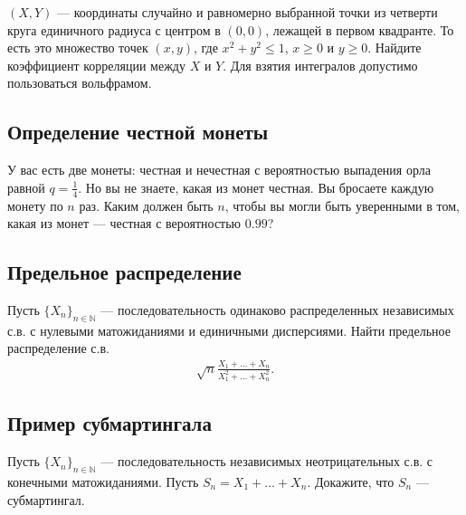 \documentclass[12pt]{article}
\newcommand\N{\mathbb{N}}
\begin{document}
$(X, Y)$ --- координаты случайно и равномерно выбранной точки из четверти круга единичного радиуса с центром в $(0, 0)$, лежащей в первом квадранте. То есть это множество точек $(x, y)$, где $x^2 + y^2 \le 1$, $x \ge 0$ и $y \ge 0$. Найдите коэффициент корреляции между $X$ и $Y$. Для взятия интегралов  допустимо пользоваться вольфрамом.


\subsection{Определение честной монеты}

У вас есть две монеты: честная и нечестная с вероятностью выпадения орла равной $q = \frac{1}{4}$. Но вы не знаете, какая из монет честная. Вы бросаете каждую монету по $n$ раз. Каким должен быть $n$, чтобы вы могли быть уверенными в том, какая из монет --- честная с вероятностью $0.99$? 


\subsection{Предельное распределение}

Пусть $\{X_n\}_{n \in \N}$ --- последовательность одинаково распределенных независимых с.в. с нулевыми матожиданиями и единичными дисперсиями. Найти предельное распределение с.в.
\begin{align*}
    \sqrt{n}\frac{X_1 + \dots + X_n}{X_1^2 + \dots + X_n^2}.
\end{align*}

\subsection{Пример субмартингала}

Пусть $\{X_n\}_{n \in \N}$ --- последовательность независимых неотрицательных с.в. с конечными матожиданиями. Пусть $S_n = X_1 + \dots + X_n$. Докажите, что $S_n$ --- субмартингал.
\end{document}
